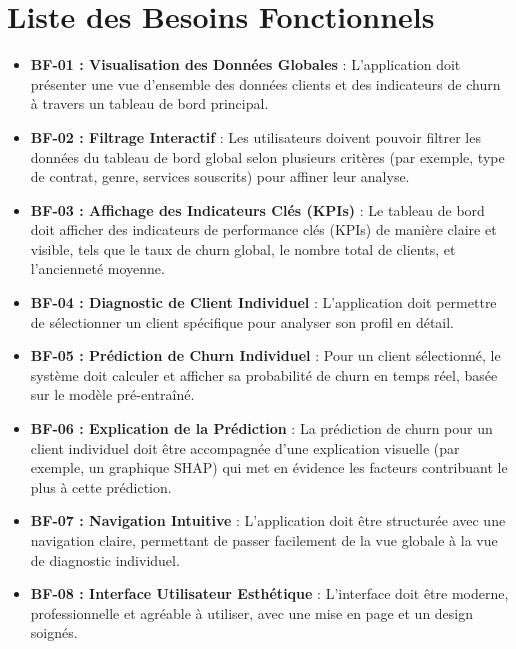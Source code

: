 \section{Liste des Besoins Fonctionnels}
\begin{itemize}
    \item \textbf{BF-01 : Visualisation des Données Globales} : L'application doit présenter une vue d'ensemble des données clients et des indicateurs de churn à travers un tableau de bord principal.
    
    \item \textbf{BF-02 : Filtrage Interactif} : Les utilisateurs doivent pouvoir filtrer les données du tableau de bord global selon plusieurs critères (par exemple, type de contrat, genre, services souscrits) pour affiner leur analyse.
    
    \item \textbf{BF-03 : Affichage des Indicateurs Clés (KPIs)} : Le tableau de bord doit afficher des indicateurs de performance clés (KPIs) de manière claire et visible, tels que le taux de churn global, le nombre total de clients, et l'ancienneté moyenne.
    
    \item \textbf{BF-04 : Diagnostic de Client Individuel} : L'application doit permettre de sélectionner un client spécifique pour analyser son profil en détail.
    
    \item \textbf{BF-05 : Prédiction de Churn Individuel} : Pour un client sélectionné, le système doit calculer et afficher sa probabilité de churn en temps réel, basée sur le modèle pré-entraîné.
    
    \item \textbf{BF-06 : Explication de la Prédiction} : La prédiction de churn pour un client individuel doit être accompagnée d'une explication visuelle (par exemple, un graphique SHAP) qui met en évidence les facteurs contribuant le plus à cette prédiction.
    
    \item \textbf{BF-07 : Navigation Intuitive} : L'application doit être structurée avec une navigation claire, permettant de passer facilement de la vue globale à la vue de diagnostic individuel.
    
    \item \textbf{BF-08 : Interface Utilisateur Esthétique} : L'interface doit être moderne, professionnelle et agréable à utiliser, avec une mise en page et un design soignés.
\end{itemize}

